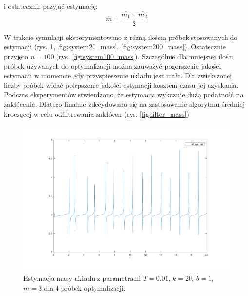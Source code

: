 \documentclass[a4paper]{article}
\begin{document}
i ostatecznie przyjąć estymację:
\begin{equation}
\hat{m} = \frac{\hat{m_1}+\hat{m_2}}{2}
\end{equation}


W trakcie symulacji eksperymentowano z różną ilością próbek stosowanych do estymacji (rys. \ref{fig:system4_mass}, \ref{fig:system20_mass}, \ref{fig:system200_mass}). Ostatecznie przyjęto $n = 100$ (rys. \ref{fig:system100_mass}). Szczególnie dla mniejszej ilości próbek używanych do optymalizacji można zauważyć pogorszenie jakości estymacji w momencie gdy przyspieszenie układu jest małe. Dla zwiększonej liczby próbek widać polepszenie jakości estymacji kosztem czasu jej uzyskania. Podczas eksperymentów stwierdzono, że estymacja wykazuje dużą podatność na zakłócenia. Dlatego finalnie zdecydowano się na zastosowanie algorytmu średniej kroczącej w celu odfiltrowania zakłócen (rys. \ref{fig:filter_mass})

\begin{figure}[H]
	\includegraphics[width=0.99\linewidth]{system4_mass}
	\centering
	\caption{Estymacja masy układu z parametrami $T=0.01$, $k = 20$, $b = 1$, $m = 3$ dla 4 próbek optymalizacji. }
	\label{fig:system4_mass}
\end{figure}
\end{document}
